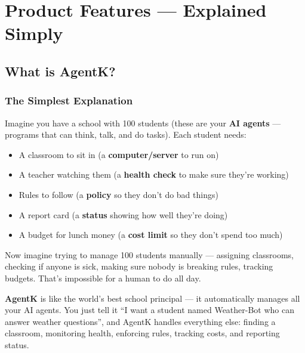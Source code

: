 \documentclass[12pt,a4paper,openany]{report}
\begin{document}
\tableofcontents
\newpage

\part{Product Features — Explained Simply}

\chapter{What is AgentK?}

\section{The Simplest Explanation}

Imagine you have a school with 100 students (these are your \textbf{AI agents} — programs that can think, talk, and do tasks). Each student needs:

\begin{itemize}
    \item A classroom to sit in (a \textbf{computer/server} to run on)
    \item A teacher watching them (a \textbf{health check} to make sure they're working)
    \item Rules to follow (a \textbf{policy} so they don't do bad things)
    \item A report card (a \textbf{status} showing how well they're doing)
    \item A budget for lunch money (a \textbf{cost limit} so they don't spend too much)
\end{itemize}

Now imagine trying to manage 100 students manually — assigning classrooms, checking if anyone is sick, making sure nobody is breaking rules, tracking budgets. That's impossible for a human to do all day.

\begin{analogybox}
\textbf{AgentK} is like the world's best school principal — it automatically manages all your AI agents. You just tell it ``I want a student named Weather-Bot who can answer weather questions'', and AgentK handles everything else: finding a classroom, monitoring health, enforcing rules, tracking costs, and reporting status.
\end{analogybox}
\end{document}
